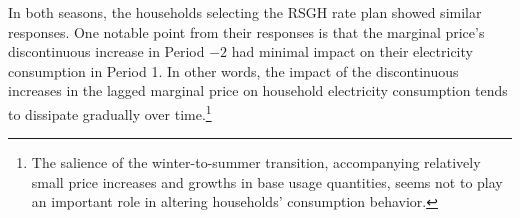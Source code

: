 In both seasons, the households selecting the RSGH rate plan showed similar responses. One notable point from their responses is that the marginal price's discontinuous increase in Period $-2$ had minimal impact on their electricity consumption in Period 1. In other words, the impact of the discontinuous increases in the lagged marginal price on household electricity consumption tends to dissipate gradually over time.\footnote{The salience of the winter-to-summer transition, accompanying relatively small price increases and growths in base usage quantities, seems not to play an important role in altering households' consumption behavior.} 
